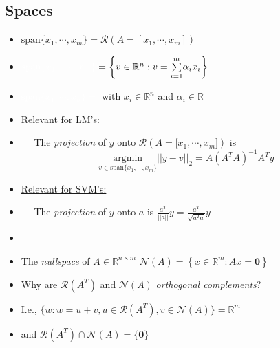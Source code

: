\documentclass[11pt, oneside]{article}
\begin{document}
\begin{minipage}{0.62\linewidth} 
\subsection{Spaces}
\begin{itemize}  
\item 
$\textrm{span}\{x_1,\cdots,x_m\} = \mathcal{R}\left(A=\left[x_1,\cdots,x_m\right] \right)$
\item[] $\textcolor{white}{\textrm{span}\{x_1,\cdots,x_m\}} = \left\{v \in \mathbb{R}^n: v=\overset{m}{\underset{i=1}{\sum}} \alpha_i x_i \right\}$ 
\item[] \textcolor{white}{$\textrm{span}\{x_1,\cdots,x_n\} =$ } 
with $x_i\in \mathbb{R}^n$ and $\alpha_i \in \mathbb{R} $
\item[] \underline{Relevant for LM's:}
\item[] $\quad$ The \emph{projection} of $y$ onto $\mathcal{R}(A = {[}x_1,\cdots,x_m{]})$ is \\
$$\underset{v \in \textrm{span}\{x_1,\cdots,x_m\}}{\textrm{argmin}} ||y - v||_2 = A(A^TA)^{-1}A^Ty$$
\item[] \underline{Relevant for SVM's:}
\item[] $\quad$ The \emph{projection} of $y$ onto $a$ is $\frac{a^T}{||a||}y = \frac{a^T}{\sqrt{a^Ta}}y$
\item[]
\item The \emph{nullspace} of $A \in \mathbb{R}^{n\times m}$ $\mathcal{N}(A) = \left\{x \in \mathbb{R}^m: Ax=\textbf{0} \right\}$ 
\item[] Why are $\mathcal{R}(A^T)$ and $\mathcal{N}(A)$ \emph{orthogonal complements}?
\item[] I.e.,  $\{w: w=u+v, u \in \mathcal{R}(A^T), v \in \mathcal{N}(A)\} = \mathbb{R}^m$ 
\item[] and $\mathcal{R}(A^T) \cap \mathcal{N}(A) = \{\textbf{0}\}$
\end{itemize}  
\end{minipage}
\end{document}
